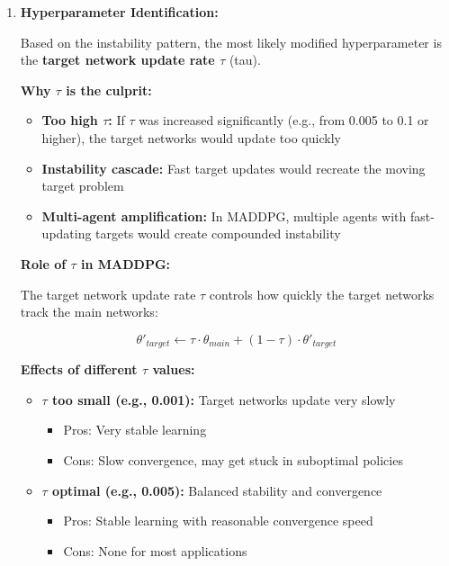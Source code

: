 \documentclass[12pt]{article}
\begin{document}
{{{{{{\begin{enumerate}
\begin{enumerate}
        \item \textbf{Hyperparameter Identification:}
        
        Based on the instability pattern, the most likely modified hyperparameter is the \textbf{target network update rate $\tau$} (tau).
        
        \textbf{Why $\tau$ is the culprit:}
        
        \begin{itemize}
            \item \textbf{Too high $\tau$:} If $\tau$ was increased significantly (e.g., from 0.005 to 0.1 or higher), the target networks would update too quickly
            \item \textbf{Instability cascade:} Fast target updates would recreate the moving target problem
            \item \textbf{Multi-agent amplification:} In MADDPG, multiple agents with fast-updating targets would create compounded instability
        \end{itemize}
        
        \textbf{Role of $\tau$ in MADDPG:}
        
        The target network update rate $\tau$ controls how quickly the target networks track the main networks:
        
        $$\theta'_{target} \leftarrow \tau \cdot \theta_{main} + (1-\tau) \cdot \theta'_{target}$$
        
        \textbf{Effects of different $\tau$ values:}
        
        \begin{itemize}
            \item \textbf{$\tau$ too small (e.g., 0.001):} Target networks update very slowly
            \begin{itemize}
                \item Pros: Very stable learning
                \item Cons: Slow convergence, may get stuck in suboptimal policies
            \end{itemize}
            
            \item \textbf{$\tau$ optimal (e.g., 0.005):} Balanced stability and convergence
            \begin{itemize}
                \item Pros: Stable learning with reasonable convergence speed
                \item Cons: None for most applications
            \end{itemize}
            

\end{itemize}
\end{enumerate}
\end{enumerate}}}}}}}
\end{document}
